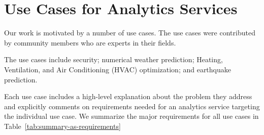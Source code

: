

\section{Use Cases for Analytics Services}
\label{sec:usecases}

Our work is motivated by a number of use cases. The use cases were
contributed by community members who are experts in their fields.


The use cases include security; numerical weather prediction; 
Heating, Ventilation, and Air Conditioning (HVAC) optimization; and earthquake prediction. 


Each use case includes a high-level explanation about the problem they address and 
explicitly comments on requirements needed for an analytics service targeting the individual use case.
We summarize the major requirements for all use cases in Table~\ref{tab:summary-as-requirements}



